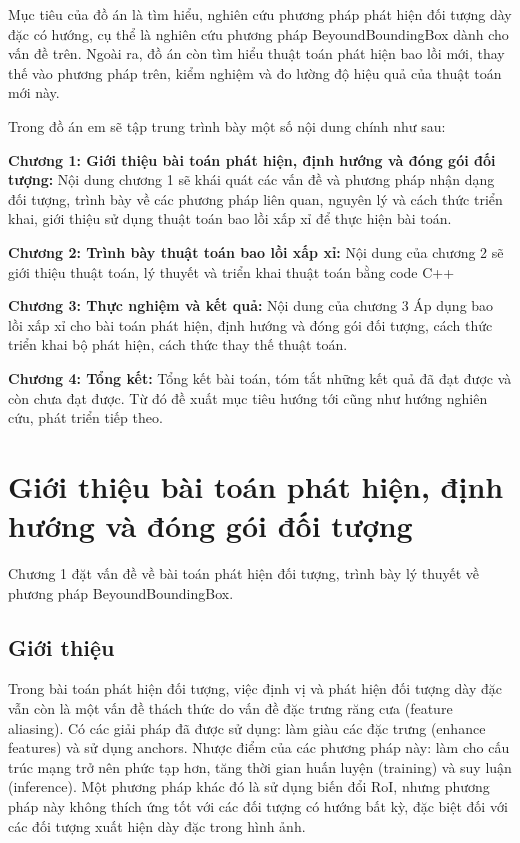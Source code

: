 \documentclass[12pt,a4paper,openany,oneside]{report}
\begin{document}
Mục tiêu của đồ án là tìm hiểu, nghiên cứu phương pháp phát hiện đối tượng dày đặc có hướng, cụ thể là nghiên cứu phương pháp BeyoundBoundingBox dành cho vấn đề trên. Ngoài ra, đồ án còn tìm hiểu thuật toán phát hiện bao lồi mới, thay thế vào phương pháp trên, kiểm nghiệm và đo lường độ hiệu quả của thuật toán mới này.


Trong đồ án em sẽ tập trung trình bày một số nội dung chính như sau:

\textbf{Chương 1: Giới thiệu bài toán phát hiện, định hướng và đóng gói đối tượng:}
Nội dung chương 1 sẽ khái quát các vấn đề và phương pháp nhận dạng đối tượng, trình bày về các phương pháp liên quan, nguyên lý và cách thức triển khai, giới thiệu sử dụng thuật toán bao lồi xấp xỉ để thực hiện bài toán.


\textbf{Chương 2: Trình bày thuật toán bao lồi xấp xỉ:}
Nội dung của chương 2 sẽ giới thiệu thuật toán, lý thuyết và triển khai thuật toán bằng code C++


\textbf{Chương 3: Thực nghiệm và kết quả:}
Nội dung của chương 3 Áp dụng bao lồi xấp xỉ cho bài toán phát hiện, định hướng và đóng gói đối tượng, cách thức triển khai bộ phát hiện, cách thức thay thế thuật toán.


\textbf{Chương 4: Tổng kết:}
Tổng kết bài toán, tóm tắt những kết quả đã đạt được và còn chưa đạt được. Từ đó đề xuất mục tiêu hướng tới cũng như hướng nghiên cứu, phát triển tiếp theo.



 


\chapter{Giới thiệu bài toán phát hiện, định hướng và đóng gói đối tượng}

Chương 1 đặt vấn đề về bài toán phát hiện đối tượng, trình bày lý thuyết về phương pháp BeyoundBoundingBox.



\section{Giới thiệu}
Trong bài toán phát hiện đối tượng, việc định vị và phát hiện đối tượng dày đặc vẫn còn là một vấn đề thách thức do vấn đề đặc trưng răng cưa (feature aliasing). Có các giải pháp đã được sử dụng: làm giàu các đặc trưng (enhance features) và sử dụng anchors. Nhược điểm của các phương pháp này: làm cho cấu trúc mạng trở nên phức tạp hơn, tăng thời gian huấn luyện (training) và suy luận (inference). Một phương pháp khác đó là sử dụng biến đổi RoI, nhưng phương pháp này không thích ứng tốt với các đối tượng có hướng bất kỳ, đặc biệt đối với các đối tượng xuất hiện dày đặc trong hình ảnh.
\end{document}
